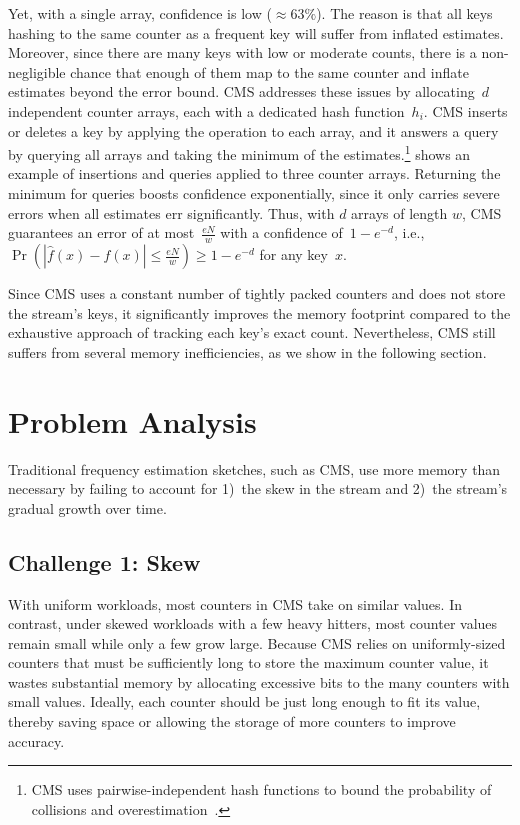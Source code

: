 \documentclass[sigconf]{acmart}
\begin{document}
Yet, with a single array, confidence is low ($\approx 63\%$). The reason is
that all keys hashing to the same counter as a frequent key will suffer from
inflated estimates. Moreover, since there are many keys with low or moderate
counts, there is a non-negligible chance that enough of them map to the same
counter and inflate estimates beyond the error bound. CMS addresses these
issues by allocating~$d$ independent counter arrays, each with a dedicated hash
function~$h_i$. CMS inserts or deletes a key by applying the operation to each
array, and it answers a query by querying all arrays and taking the minimum of
the estimates.\footnote{CMS uses pairwise-independent hash functions to bound
the probability of collisions and overestimation~\cite{CountMin}.}
 shows an example of insertions and queries applied to
three counter arrays. Returning the minimum for queries boosts confidence
exponentially, since it only carries severe errors when all estimates err
significantly. Thus, with $d$ arrays of length $w$, CMS guarantees an error of
at most~$\frac{eN}{w}$ with a confidence of~$1-e^{-d}$, i.e., $\Pr\left(
|\hat{f}(x)-f(x)| \leq \frac{eN}{w} \right) \geq 1-e^{-d}$ for any key~$x$.

Since CMS uses a constant number of tightly packed counters and does not store
the stream's keys, it significantly improves the memory footprint compared to
the exhaustive approach of tracking each key's exact count. Nevertheless, CMS
still suffers from several memory inefficiencies, as we show in the following
section.

\section{Problem Analysis}\label{sec:problem_analysis}
Traditional frequency estimation sketches, such as CMS, use more memory than
necessary by failing to account for 1)~the skew in the stream and 2)~the
stream's gradual growth over time.

\subsection{Challenge 1: Skew}
With uniform workloads, most counters in CMS take on similar values. In
contrast, under skewed workloads with a few heavy hitters, most counter values
remain small while only a few grow large. Because CMS relies on uniformly-sized
counters that must be sufficiently long to store the maximum counter value, it
wastes substantial memory by allocating excessive bits to the many counters
with small values. Ideally, each counter should be just long enough to fit its
value, thereby saving space or allowing the storage of more counters to improve
accuracy.
\end{document}
